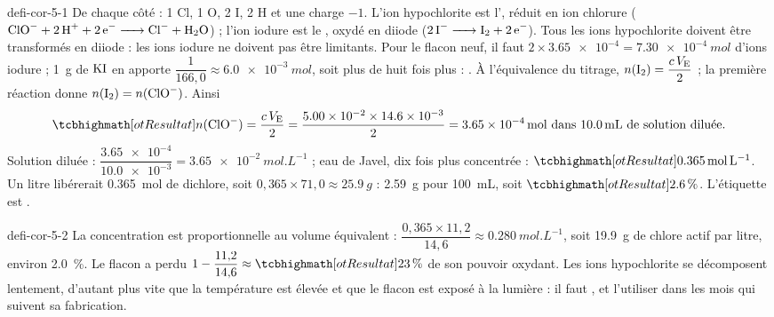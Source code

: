 \begin{blocEdition}{defi-cor-5-1}
De chaque côté : 1 Cl, 1 O, 2 I, 2 H et une charge $-1$. L'ion hypochlorite est l', réduit en ion chlorure
($\ce{ClO- + 2H+ + 2e- -> Cl- + H2O}$) ; l'ion iodure est le , oxydé en diiode ($\ce{2I- -> I2 + 2e-}$).
Tous les ions hypochlorite doivent être transformés en diiode : les ions iodure ne doivent pas être limitants. Pour le
flacon neuf, il faut $2\times\num{3.65e-4}=\qty{7,30e-4}{mol}$ d'ions iodure ; \qty{1}{g} de $\ce{KI}$ en apporte $\dfrac{1}{166{,}0}\approx\qty{6,0e-3}{mol}$,
soit plus de huit fois plus : .
À l'équivalence du titrage, $n(\ce{I2})=\dfrac{c\,V_\mathrm{E}}{2}$ ; la première réaction donne $n(\ce{I2})=n(\ce{ClO-})$. Ainsi
\[\res{n(\ce{ClO-})=\frac{c\,V_\mathrm{E}}{2}}=\frac{\num{5.00e-2}\times\num{14.6e-3}}{2}=\qty{3,65e-4}{mol}\text{ dans \qty{10,0}{mL} de solution diluée.}\]
Solution diluée : $\dfrac{\num{3.65e-4}}{\num{10.0e-3}}=\qty{3,65e-2}{mol.L^{-1}}$ ; eau de Javel, dix fois plus concentrée : $\res{\qty{0,365}{mol.L^{-1}}}$.
Un litre libérerait \qty{0,365}{mol} de dichlore, soit $0{,}365\times71{,}0\approx\qty{25,9}{g}$ : \qty{2,59}{g} pour \qty{100}{mL}, soit $\res{\qty{2,6}{\percent}}$.
L'étiquette est .
\end{blocEdition}

\begin{blocEdition}{defi-cor-5-2}
\label{figedition-defi-cor-5-2-1}
La concentration est proportionnelle au volume équivalent : $\dfrac{0{,}365\times11{,}2}{14{,}6}\approx\qty{0,280}{mol.L^{-1}}$, soit \qty{19,9}{g} de chlore
actif par litre, environ \qty{2,0}{\percent}. Le flacon a perdu $1-\dfrac{11{,}2}{14{,}6}\approx\res{\qty{23}{\percent}}$ de son pouvoir oxydant. Les ions
hypochlorite se décomposent lentement, d'autant plus vite que la température est élevée et que le flacon est exposé à la
lumière : il faut , et l'utiliser dans les mois qui suivent
sa fabrication.
\end{blocEdition}

